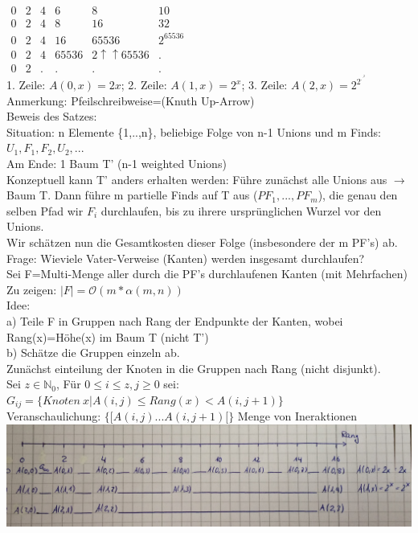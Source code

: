 \documentclass[a4paper]{article}
\newcommand{\oh}[1]{$\mathcal{O}(#1)$}
\begin{document}
$\begin{matrix}
0&2&4&6&8&10\\
0&2&4&8&16&32\\
0&2&4&16&65536&2^{65536}&\\
0&2&4&65536&2\uparrow\uparrow65536&.\\
0&2&.&.&.&.
\end{matrix}
$\\
1. Zeile: $A(0,x)=2x$; 2. Zeile: $A(1,x)=2^x$; 3. Zeile: $A(2,x)=2^{2^{.^{.^2}}}$\\
Anmerkung: Pfeilschreibweise=(Knuth Up-Arrow)\\
Beweis des Satzes:\\
Situation: n Elemente \{1,..,n\}, beliebige Folge von n-1 Unions und m Finds: $U_1,F_1,F_2,U_2,...$\\
Am Ende: 1 Baum T' (n-1 weighted Unions)\\
Konzeptuell kann T' anders erhalten werden: Führe zunächst alle Unions aus $\rightarrow$ Baum T. Dann führe m partielle Finds auf T aus ($PF_1,...,PF_m$), die genau den selben Pfad wir $F_i$ durchlaufen, bis zu ihrere ursprünglichen Wurzel vor den Unions.\\
Wir schätzen nun die Gesamtkosten dieser Folge (insbesondere der m PF's) ab.\\
Frage: Wieviele Vater-Verweise (Kanten) werden insgesamt durchlaufen?\\
Sei F=Multi-Menge aller durch die PF's durchlaufenen Kanten (mit Mehrfachen)\\
Zu zeigen: $|F| = $\oh{m*\alpha(m,n)}\\
Idee:\\
a) Teile F in Gruppen nach Rang der Endpunkte der Kanten, wobei Rang(x)=Höhe(x) im Baum T (nicht T')\\
b) Schätze die Gruppen einzeln ab.\\
Zunächst einteilung der Knoten in die Gruppen nach Rang (nicht disjunkt).\\
Sei $z\in\mathbb{N}_0$, Für $0\leq i \leq z, j\geq 0$ sei:\\
$G_{ij}=\lbrace Knoten\ x|A(i,j)\leq Rang(x)<A(i,j+1)\rbrace$\\
Veranschaulichung: $\lbrace [A(i,j) ... A(i,j+1)[\rbrace$ Menge von Ineraktionen\\
\includegraphics[scale=0.15]{Bild3.png}\\
\end{document}
